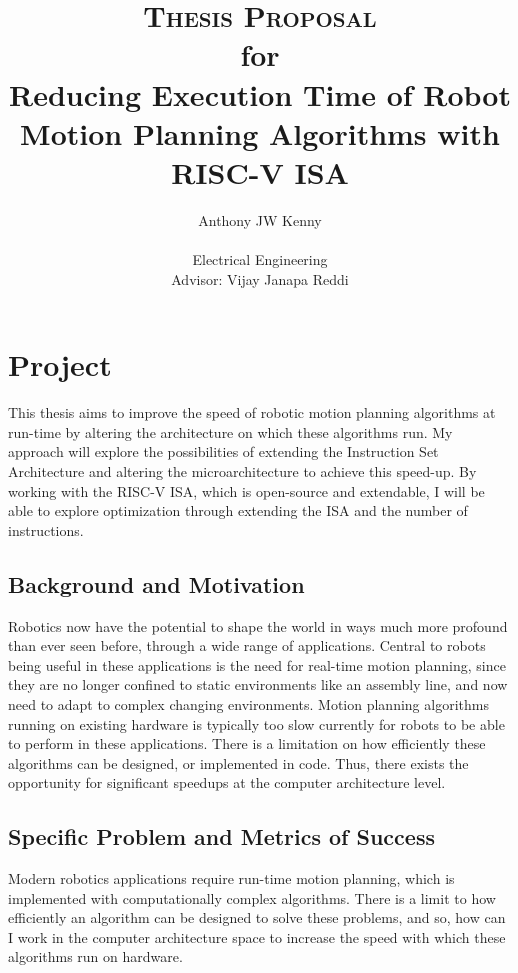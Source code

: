 \documentclass[11pt, oneside]{article}   	%
\title{\textsc{Thesis Proposal} \\ 
	\small{for} \\ 
	\Large{Reducing Execution Time of Robot Motion Planning Algorithms with RISC-V ISA}}
\author{Anthony JW Kenny \\ \\
        Electrical Engineering \\
        Advisor: Vijay Janapa Reddi}
\begin{document}
\maketitle
 


\section{Project}
This thesis aims to improve the speed of robotic motion planning algorithms at run-time by altering the architecture on which these algorithms run. My approach will explore the possibilities of extending the Instruction Set Architecture and altering the microarchitecture to achieve this speed-up. By working with the RISC-V ISA, which is open-source and extendable, I will be able to explore optimization through extending the ISA and the number of instructions.

\subsection{Background and Motivation}
Robotics now have the potential to shape the world in ways much more profound than ever seen before, through a wide range of applications. Central to robots being useful in these applications is the need for real-time motion planning, since they are no longer confined to static environments like an assembly line, and now need to adapt to complex changing environments. Motion planning algorithms running on existing hardware is typically too slow currently for robots to be able to perform in these applications. There is a limitation on how efficiently these algorithms can be designed, or implemented in code. Thus, there exists the opportunity for significant speedups at the computer architecture level. 

\subsection{Specific Problem and Metrics of Success}
Modern robotics applications require run-time motion planning, which is implemented with computationally complex algorithms. There is a limit to how efficiently an algorithm can be designed to solve these problems, and so, how can I work in the computer architecture space to increase the speed with which these algorithms run on hardware.
\end{document}
